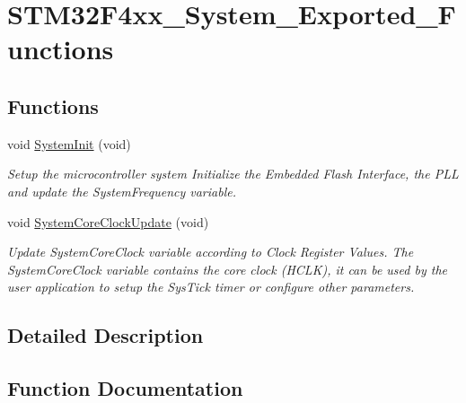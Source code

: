 \hypertarget{group___s_t_m32_f4xx___system___exported___functions}{}\section{S\+T\+M32\+F4xx\+\_\+\+System\+\_\+\+Exported\+\_\+\+Functions}
\label{group___s_t_m32_f4xx___system___exported___functions}
\subsection*{Functions}
\begin{DoxyCompactItemize}
\item 
void \hyperlink{group___s_t_m32_f4xx___system___exported___functions_ga93f514700ccf00d08dbdcff7f1224eb2}{System\+Init} (void)
\begin{DoxyCompactList}\small\item\em Setup the microcontroller system Initialize the Embedded Flash Interface, the P\+L\+L and update the System\+Frequency variable. \end{DoxyCompactList}\item 
void \hyperlink{group___s_t_m32_f4xx___system___exported___functions_gae0c36a9591fe6e9c45ecb21a794f0f0f}{System\+Core\+Clock\+Update} (void)
\begin{DoxyCompactList}\small\item\em Update System\+Core\+Clock variable according to Clock Register Values. The System\+Core\+Clock variable contains the core clock (H\+C\+L\+K), it can be used by the user application to setup the Sys\+Tick timer or configure other parameters. \end{DoxyCompactList}\end{DoxyCompactItemize}


\subsection{Detailed Description}


\subsection{Function Documentation}
\hypertarget{group___s_t_m32_f4xx___system___exported___functions_gae0c36a9591fe6e9c45ecb21a794f0f0f}{}
